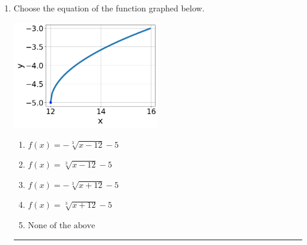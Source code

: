 \documentclass[14pt]{extbook}
\newcommand{\litem}[1]{\item#1\hspace*{-1cm}\rule{\textwidth}{0.4pt}}
\begin{document}
\begin{enumerate}
\litem{
Choose the equation of the function graphed below.
\begin{center}
    \includegraphics[width=0.5\textwidth]{../Figures/radicalGraphToEquationC.png}
\end{center}
\begin{enumerate}[label=\Alph*.]
\item \( f(x) = - \sqrt[3]{x - 12} - 5 \)
\item \( f(x) = \sqrt[3]{x - 12} - 5 \)
\item \( f(x) = - \sqrt[3]{x + 12} - 5 \)
\item \( f(x) = \sqrt[3]{x + 12} - 5 \)
\item \( \text{None of the above} \)


\end{enumerate}}
\end{enumerate}
\end{document}
